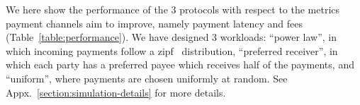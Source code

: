   We here
  show the performance of the $3$ protocols with respect to the metrics payment
  channels aim to improve, namely payment latency and
  fees (Table~\ref{table:performance}). We have designed 3 workloads: ``power law'', in
  which incoming payments follow a zipf~\cite{powers-1998-applications}
  distribution, ``preferred receiver'', in which each party has a preferred
  payee which receives half of the payments, and ``uniform'', where payments are
  chosen uniformly at random.
  See Appx.~\ref{section:simulation-details} for more details.

%
